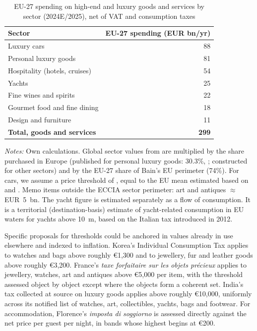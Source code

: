 \documentclass{article}
\begin{document}
\begin{table}[ht]
\centering
\small
\caption{EU-27 spending on high-end and luxury goods and services by sector (2024E/2025), net of VAT and consumption taxes}
\label{tab:eu27sectors}
\begin{tabular}{@{}l r@{}}
\toprule
Sector & EU-27 spending (EUR bn/yr) \\
\midrule
Luxury cars& 88\\
Personal luxury goods& 81  \\
Hospitality (hotels, cruises)      & 54  \\
Yachts& 25\\
Fine wines and spirits& 22\\
Gourmet food and fine dining& 18\\
Design and furniture& 11\\
\midrule
\textbf{Total, goods and services} & \textbf{299}\\
\bottomrule
\end{tabular}

\begin{minipage}{0.95\linewidth}
\footnotesize
\emph{Notes:} Own calculations. Global sector values from \citet{ECCIA2025} are multiplied by the share purchased in Europe (published for personal luxury goods: 30.3\%, \citealp{BainAltagamma2024}; constructed for other sectors) and by the EU-27 share of Bain's EU perimeter (74\%).
For cars, we assume a price threshold of , equal to the EU mean estimated based on \citep{UNRAE2025} and \citep{DAT2026}.  %
Memo items outside the ECCIA sector perimeter: art and antiques $\approx$ EUR~5~bn. The yacht figure is estimated separately as a flow of consumption. It is a territorial (destination-basis) estimate of yacht-related consumption in EU waters for yachts above 10~m, based on the Italian tax introduced in 2012.
\end{minipage}
\end{table}
\normalsize
\FloatBarrier

Specific proposals for thresholds could be anchored in values already in use elsewhere and indexed to inflation. Korea's Individual Consumption Tax applies to watches and bags above roughly \euro{}1{,}300 and to
jewellery, fur and leather goods above roughly \euro{}3{,}200. France's \emph{taxe forfaitaire sur
les objets pr\'ecieux} applies to jewellery, watches, art and antiques above \euro{}5{,}000 per
item, with the threshold assessed object by object except where the objects form a coherent set. %
India's tax collected at source on luxury goods applies above roughly \euro{}10{,}000, uniformly
across its notified list of watches, art, collectibles, yachts, bags and footwear. For accommodation, Florence's \emph{imposta di soggiorno} is assessed directly against the
net price per guest per night, in bands whose highest begins at \euro{}200.
\end{document}
